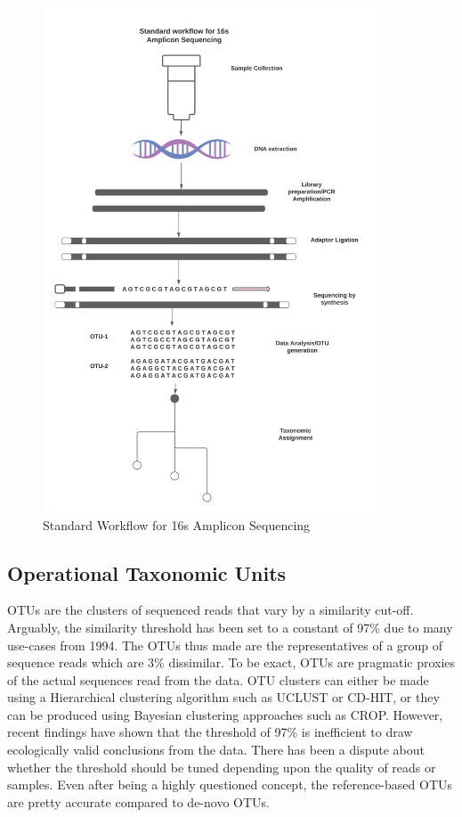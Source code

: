 \begin{figure}[!hb]
  \centering
  \includegraphics[width=10cm, height=15cm]{../figures/Figure3.png}
  \caption{Standard Workflow for 16s Amplicon Sequencing}
  \label{fig:figure3}
\end{figure}

\subsection{Operational Taxonomic Units}
OTUs are the clusters of sequenced reads that vary by a similarity cut-off. Arguably, the similarity threshold has been set to a constant of 97\% due to many use-cases from 1994. The OTUs thus made are the representatives of a group of sequence reads which are 3\% dissimilar. To be exact, OTUs are pragmatic proxies of the actual sequences read from the data. OTU clusters can either be made using a Hierarchical clustering algorithm such as UCLUST or CD-HIT, or they can be produced using Bayesian clustering approaches such as CROP. However, recent findings have shown that the threshold of 97\% is inefficient to draw ecologically valid conclusions from the data. There has been a dispute about whether the threshold should be tuned depending upon the quality of reads or samples. Even after being a highly questioned concept, the reference-based OTUs are pretty accurate compared to de-novo OTUs. 

